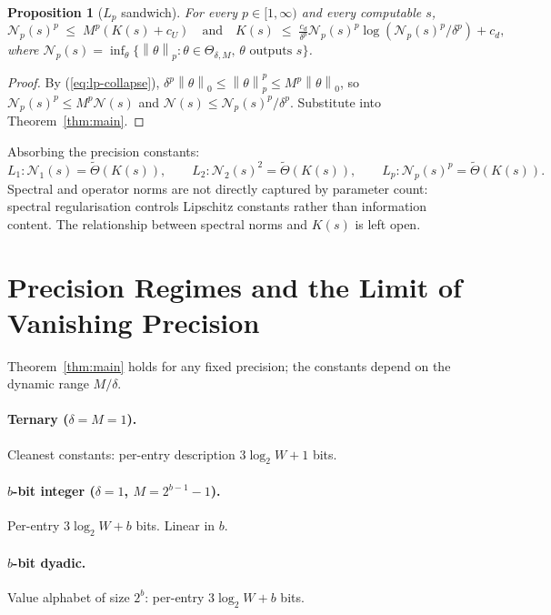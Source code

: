 \documentclass{article}
\newtheorem{proposition}[theorem]{Proposition}
\theoremstyle{definition}
\newcommand{\norm}[1]{\left\lVert#1\right\rVert}
\newcommand{\nc}{\mathcal{N}}
\newcommand{\Param}{\Theta}
\begin{document}
\begin{proposition}[$L_p$ sandwich]\label{prop:lp}
  For every $p \in [1, \infty)$ and every computable $s$,
  \[
    \nc_p(s)^p \;\le\; M^p (K(s) + c_U) \quad \text{and} \quad K(s) \;\le\; \tfrac{c_d}{\delta^p} \nc_p(s)^p \log(\nc_p(s)^p / \delta^p) + c_d,
  \]
  where $\nc_p(s) = \inf_\theta \{ \norm{\theta}_p : \theta \in \Param_{\delta,
      M},\, \theta \text{ outputs } s \}$.
\end{proposition}

\begin{proof}
  By (\ref{eq:lp-collapse}), $\delta^p \norm{\theta}_0 \le \norm{\theta}_p^p \le M^p \norm{\theta}_0$, so $\nc_p(s)^p \le M^p \nc(s)$ and $\nc(s) \le \nc_p(s)^p / \delta^p$. Substitute into Theorem~\ref{thm:main}.
\end{proof}

Absorbing the precision constants:
\[
  L_1: \nc_1(s) = \tilde\Theta(K(s)), \qquad L_2: \nc_2(s)^2 = \tilde\Theta(K(s)), \qquad L_p: \nc_p(s)^p = \tilde\Theta(K(s)).
\]
Spectral and operator norms are not directly captured by parameter count:
spectral regularisation controls Lipschitz constants rather than information
content. The relationship between spectral norms and $K(s)$ is left open.

\section{Precision Regimes and the Limit of Vanishing Precision}\label{app:precision}

Theorem~\ref{thm:main} holds for any fixed precision; the constants depend on
the dynamic range $M/\delta$.

\paragraph{Ternary ($\delta = M = 1$).} Cleanest constants: per-entry description $3 \log_2 W + 1$ bits.

\paragraph{$b$-bit integer ($\delta = 1$, $M = 2^{b-1} - 1$).} Per-entry $3 \log_2 W + b$ bits. Linear in $b$.

\paragraph{$b$-bit dyadic.} Value alphabet of size $2^b$: per-entry $3 \log_2 W + b$ bits.
\end{document}
